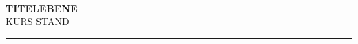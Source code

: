 \documentclass[11pt,a4paper]{article}
\theoremstyle{definition}
\begin{document}
\noindent{\color{akzent}\rule{\linewidth}{1.2pt}}\\[4pt]
{\LARGE\bfseries TITEL}\hfill{\large\color{akzent}\bfseries EBENE}\\[3pt]
{\large KURS}\hfill{\footnotesize\color{gray} STAND}\\[-2pt]
{\color{akzent}\rule{\linewidth}{0.6pt}}
\vspace{2mm}

\end{document}
